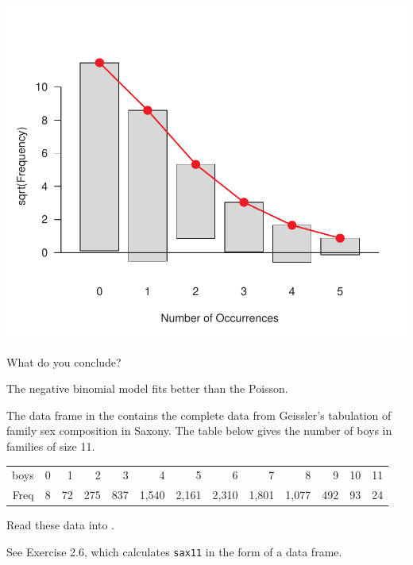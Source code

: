 \documentclass[10pt]{report}\usepackage[]{graphicx}\usepackage[]{color}
\newenvironment{knitrout}{}{} %
\renewenvironment{knitrout}{\small\renewcommand{\baselinestretch}{.85}}{} %
\begin{document}
\begin{Exercises}
\begin{enumerate*}
\begin{ans}
\begin{knitrout}
\centerline{\includegraphics[width=.5\textwidth]{soln/fig/ex3_6c-1} }



\end{knitrout}
    \end{ans}
    
    \item What do you conclude?
    \begin{ans}
    The negative binomial model fits better than the Poisson.
    \end{ans}
    
  \end{enumerate*}

  \exercise The data frame  in the  contains the complete data from Geissler's \citeyearpar{Geissler:1889} tabulation of family sex composition in Saxony.  The table below gives the number of boys in families of size 11.

\begin{tabular}{r|rrrrrrrrrrrr}
  \hline
boys &   0 &   1 &   2 &   3 &   4 &   5 &   6 &   7 &   8 &   9 &  10 &  11 \\
  Freq &   8 &  72 & 275 & 837 & 1,540 & 2,161 & 2,310 & 1,801 & 1,077 & 492 &  93 &  24 \\
   \hline
\end{tabular}

  \begin{enumerate*}
    \item Read these data into \R.
    \begin{ans}
    See Exercise 2.6, which calculates \texttt{sax11} in the form of a data frame.
    \end{ans}


\end{enumerate*}
\end{Exercises}
\end{document}
